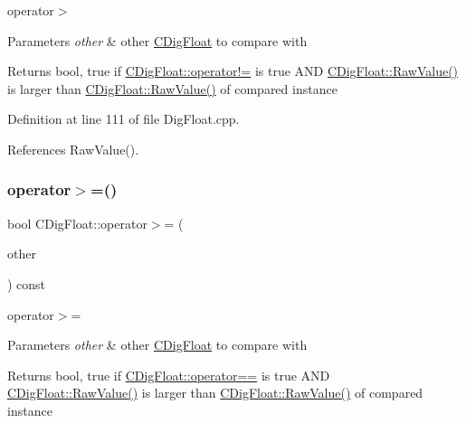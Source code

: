 operator$>$ 


\begin{DoxyParams}{Parameters}
{\em other} & other \hyperlink{classCDigFloat}{C\+Dig\+Float} to compare with \\
\hline
\end{DoxyParams}
\begin{DoxyReturn}{Returns}
bool, true if \hyperlink{classCDigFloat_a15c13c035aff8184491bd9629403a33a}{C\+Dig\+Float\+::operator!=} is true A\+ND \hyperlink{classCDigFloat_acb435346b1f7b2e78d8f8373a416533a}{C\+Dig\+Float\+::\+Raw\+Value()} is larger than \hyperlink{classCDigFloat_acb435346b1f7b2e78d8f8373a416533a}{C\+Dig\+Float\+::\+Raw\+Value()} of compared instance 
\end{DoxyReturn}


Definition at line 111 of file Dig\+Float.\+cpp.



References Raw\+Value().

\mbox{\label{classCDigFloat_a08f4104630ae80e20f2768c28abea10f}} 
\subsubsection{\texorpdfstring{operator$>$=()}{operator>=()}}
{\footnotesize\ttfamily bool C\+Dig\+Float\+::operator$>$= (\begin{DoxyParamCaption}\item[{const \hyperlink{classCDigFloat}{C\+Dig\+Float} \&}]{other }\end{DoxyParamCaption}) const}



operator$>$= 


\begin{DoxyParams}{Parameters}
{\em other} & other \hyperlink{classCDigFloat}{C\+Dig\+Float} to compare with \\
\hline
\end{DoxyParams}
\begin{DoxyReturn}{Returns}
bool, true if \hyperlink{classCDigFloat_ad8980d984bf2bab71d15b830fd0180a5}{C\+Dig\+Float\+::operator==} is true A\+ND \hyperlink{classCDigFloat_acb435346b1f7b2e78d8f8373a416533a}{C\+Dig\+Float\+::\+Raw\+Value()} is larger than \hyperlink{classCDigFloat_acb435346b1f7b2e78d8f8373a416533a}{C\+Dig\+Float\+::\+Raw\+Value()} of compared instance 
\end{DoxyReturn}


